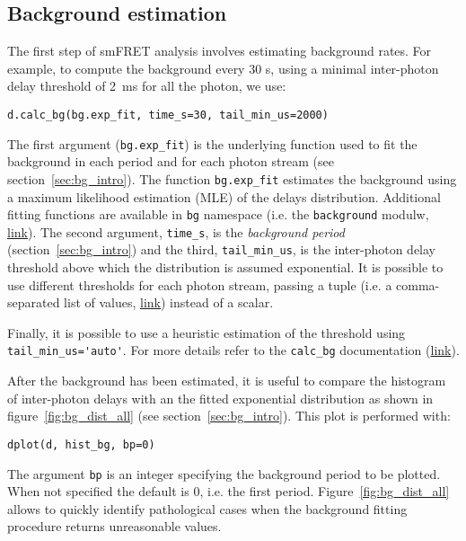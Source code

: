 \subsection{Background estimation}
\label{sec:bg_calc}

The first step of smFRET analysis involves estimating background rates.
For example, to compute the background every 30 s, using a minimal inter-photon
delay threshold of 2~ms for all the photon, we use:

\begin{lstlisting}
d.calc_bg(bg.exp_fit, time_s=30, tail_min_us=2000)
\end{lstlisting}

The first argument (\verb|bg.exp_fit|) is the underlying function used to fit the
background in each period and for each photon stream (see section~\ref{sec:bg_intro}).
The function
\verb|bg.exp_fit| estimates the background using a maximum likelihood estimation
(MLE) of the delays distribution. Additional fitting functions are available in
\verb|bg| namespace 
(i.e. the \verb|background| modulw, \href{http://fretbursts.readthedocs.org/en/latest/background.html}
{link}). The second argument, \verb|time_s|, is the
\textit{background period} (section~\ref{sec:bg_intro}) and the third, \verb|tail_min_us|,
is the inter-photon delay threshold above which the distribution is assumed exponential.
It is possible to use different thresholds for each photon stream, passing a
tuple (i.e. a comma-separated list of values, \href{https://docs.python.org/3.5/tutorial/datastructures.html#tuples-and-sequences}{link}) instead of a scalar.

Finally, it is possible to use a heuristic estimation of the threshold using
\verb|tail_min_us='auto'|. For more details refer to the \verb|calc_bg| documentation
(\href{http://fretbursts.readthedocs.org/en/latest/data\_class.html#fretbursts.burstlib.Data.calc_bg}{link}).

After the background has been estimated, it is useful to compare the histogram of 
inter-photon delays with an the fitted exponential distribution as shown in figure~\ref{fig:bg_dist_all}
(see section~\ref{sec:bg_intro}). This plot is performed with:

\begin{lstlisting}
dplot(d, hist_bg, bp=0)
\end{lstlisting}

The argument \verb|bp| is an integer specifying the background period to be plotted.
When not specified the default is 0, i.e. the first period.
Figure~\ref{fig:bg_dist_all} allows to quickly identify pathological cases when the 
background fitting procedure returns unreasonable values. 

